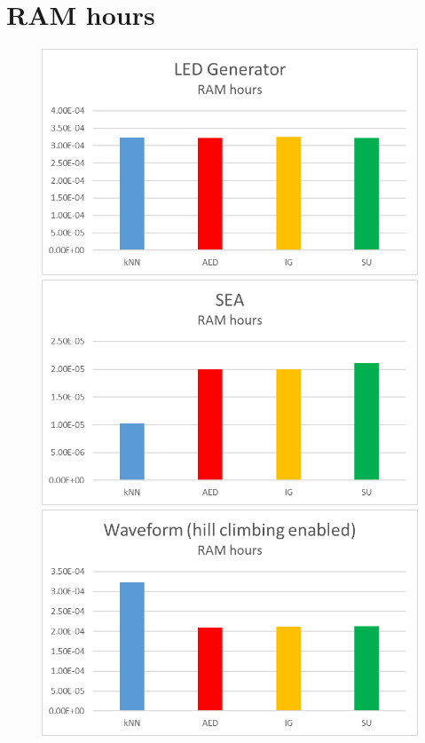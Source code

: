 \section{RAM hours}
\begin{figure}[hp]
\centering
\includegraphics[scale=0.17]{Graphs/LED/10_mem}
\includegraphics[scale=0.17]{Graphs/SEA/mem}
\includegraphics[scale=0.17]{Graphs/Waveform/mem}

\end{figure}
